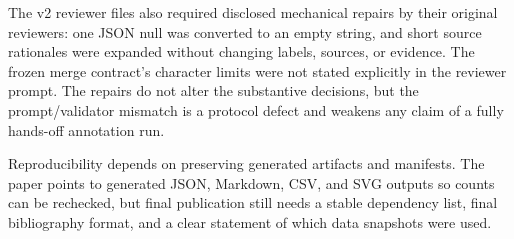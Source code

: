 The v2 reviewer files also required disclosed mechanical repairs by their original reviewers: one JSON null was converted to an empty string, and short source rationales were expanded without changing labels, sources, or evidence. The frozen merge contract's character limits were not stated explicitly in the reviewer prompt. The repairs do not alter the substantive decisions, but the prompt/validator mismatch is a protocol defect and weakens any claim of a fully hands-off annotation run.

Reproducibility depends on preserving generated artifacts and manifests. The paper points to generated JSON, Markdown, CSV, and SVG outputs so counts can be rechecked, but final publication still needs a stable dependency list, final bibliography format, and a clear statement of which data snapshots were used.
